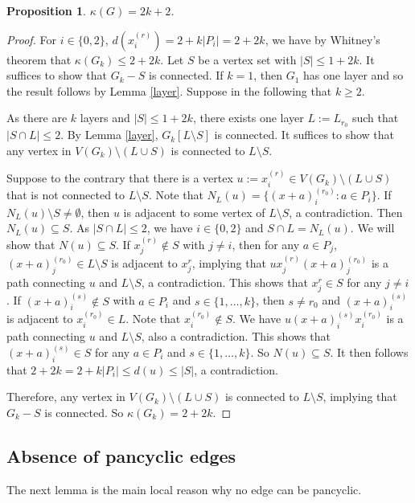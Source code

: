\documentclass[12pt]{article}
\newtheorem{proposition}{Proposition}
\begin{document}
\begin{proposition} $\kappa(G)= 
2k+2$.
\end{proposition}
\begin{proof}
For $i\in \{0,2\}$, $d(x_i^{(r)})=2+k|P_i|=2+2k$, we have by Whitney's theorem that $\kappa(G_k)\le 2+2k$.
Let $S$ be a vertex set with $|S|\le 1+2k$. It suffices to show that $G_k-S$ is connected. If $k=1$, then $G_1$ has one layer and so the result follows by Lemma \ref{layer}. Suppose in the following that $k\ge 2$.

As there are $k$ layers and $|S|\le 1+2k$, there exists one layer $L:=L_{r_0}$ such that $|S\cap L|\le 2$. By Lemma \ref{layer}, $G_k[L\setminus S]$ is connected. 
It suffices to show that any vertex in $V(G_k)\setminus (L\cup S)$ is connected to $L\setminus S$.

Suppose to the contrary that there is a vertex $u:=x_i^{(r)}\in V(G_k)\setminus (L\cup S)$ that is not connected to $L\setminus S$. 
Note that $N_L(u)=\{(x+a)_i^{(r_0)}:a\in P_i\}$. If $N_L(u)\setminus S\ne \emptyset$, then $u$ is adjacent to some vertex of $L\setminus S$, a contradiction. Then $N_L(u)\subseteq S$. As $|S\cap L|\le 2$, we have $i\in \{0,2\}$ and $S\cap L=N_L(u)$. %
We will show that $N(u)\subseteq S$. 
If $x_j^{(r)}\notin S$ with $j\ne i$, then for any $a\in P_j$, $(x+a)_j^{(r_0)}\in L\setminus S$ is adjacent to $x_j^r$, implying that $ux_j^{(r)}(x+a)_j^{(r_0)}$ is a path connecting $u$ and $L\setminus S$, a contradiction. This shows that $x_j^r\in S$ for any $j\ne i$. If $(x+a)_i^{(s)}\notin S$ with $a\in P_i$ and $s\in \{1,\dots,k\}$, then $s\ne r_0$ and $(x+a)_i^{(s)}$ is adjacent to $x_i^{(r_0)}\in L$. Note that $x_i^{(r_0)}\notin S$. We have $u(x+a)_i^{(s)}x_i^{(r_0)}$ is a path connecting $u$ and $L\setminus S$, also a contradiction. This shows that  $(x+a)_i^{(s)}\in S$ for any $a\in P_i$ and $s\in \{1,\dots,k\}$. So $N(u)\subseteq S$. 
It then follows that $2+2k=2+k|P_i|\le d(u)\le |S|$, a contradiction. 

Therefore, any vertex in $V(G_k)\setminus (L\cup S)$ is connected to $L\setminus S$, implying that $G_k-S$ is connected. So  $\kappa(G_k)= 2+2k$.
\end{proof}
\subsection{Absence of pancyclic edges}\label{sec:noedge}

The next lemma is the main local reason why no edge can be pancyclic.
\end{document}
